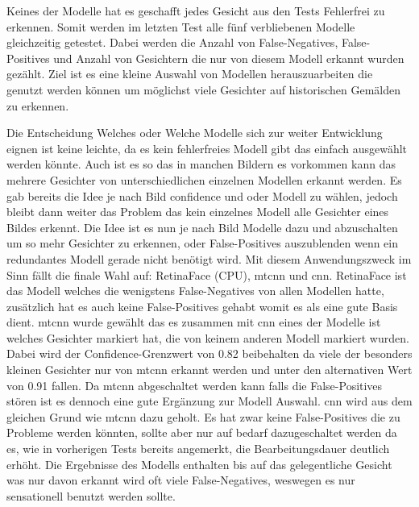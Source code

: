 Keines der Modelle hat es geschafft jedes Gesicht aus den Tests Fehlerfrei zu erkennen. Somit werden im letzten Test alle fünf verbliebenen Modelle gleichzeitig getestet. Dabei werden die Anzahl von False-Negatives, False-Positives und Anzahl von Gesichtern die nur von diesem Modell erkannt wurden gezählt. Ziel ist es eine kleine Auswahl von Modellen herauszuarbeiten die genutzt werden können um möglichst viele Gesichter auf historischen Gemälden zu erkennen.

Die Entscheidung Welches oder Welche Modelle sich zur weiter Entwicklung eignen ist keine leichte, da es kein fehlerfreies Modell gibt das einfach ausgewählt werden könnte. Auch ist es so das in manchen Bildern es vorkommen kann das mehrere Gesichter von unterschiedlichen einzelnen Modellen erkannt werden. Es gab bereits die Idee je nach Bild confidence und oder Modell zu wählen, jedoch bleibt dann weiter das Problem das kein einzelnes Modell alle Gesichter eines Bildes erkennt. Die Idee ist es nun je nach Bild Modelle dazu und abzuschalten um so mehr Gesichter zu erkennen, oder False-Positives auszublenden wenn ein redundantes Modell gerade nicht benötigt wird. Mit diesem Anwendungszweck im Sinn fällt die finale Wahl auf: RetinaFace (CPU), \gls{mtcnn} und \gls{cnn}. RetinaFace ist das Modell welches die wenigstens False-Negatives von allen Modellen hatte, zusätzlich hat es auch keine False-Positives gehabt womit es als eine gute Basis dient. \gls{mtcnn} wurde gewählt das es zusammen mit \gls{cnn} eines der Modelle ist welches Gesichter markiert hat, die von keinem anderen Modell markiert wurden. Dabei wird der Confidence-Grenzwert von 0.82 beibehalten da viele der besonders kleinen Gesichter nur von \gls{mtcnn} erkannt werden und unter den alternativen Wert von 0.91 fallen. Da \gls{mtcnn} abgeschaltet werden kann falls die False-Positives stören ist es dennoch eine gute Ergänzung zur Modell Auswahl. \gls{cnn} wird aus dem gleichen Grund wie \gls{mtcnn} dazu geholt. Es hat zwar keine False-Positives die zu Probleme werden könnten, sollte aber nur auf bedarf dazugeschaltet werden da es, wie in vorherigen Tests bereits angemerkt, die Bearbeitungsdauer deutlich erhöht. Die Ergebnisse des Modells enthalten bis auf das gelegentliche Gesicht was nur davon erkannt wird oft viele False-Negatives, weswegen es nur sensationell benutzt werden sollte.
